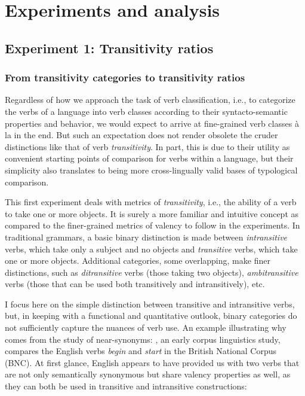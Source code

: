 \chapter{Experiments and analysis}
\section{Experiment 1: Transitivity ratios}\label{sec:exp1}
\subsection{From transitivity categories to transitivity ratios}
Regardless of how we approach the task of verb classification, i.e., to categorize the verbs of a language into verb classes according to their syntacto-semantic properties and behavior, we would expect to arrive at fine-grained verb classes à la \citet{levin1993} in the end. But such an expectation does not render obsolete the cruder distinctions like that of verb \textit{transitivity}. In part, this is due to their utility as convenient starting points of comparison for verbs within a language, but their simplicity also translates to being more cross-lingually valid bases of typological comparison. 

This first experiment deals with metrics of \textit{transitivity}, i.e., the ability of a verb to take one or more objects. It is surely a more familiar and intuitive concept as compared to the finer-grained metrics of valency to follow in the experiments. In traditional grammars, a basic binary distinction is made between \textit{intransitive} verbs, which take only a subject and no objects and \textit{transitive} verbs, which take one or more objects. Additional categories, some overlapping, make finer distinctions, such as \textit{ditransitive} verbs (those taking two objects), \textit{ambitransitive} verbs (those that can be used both transitively and intransitively), etc.

I focus here on the simple distinction between transitive and intransitive verbs, but, in keeping with a functional and quantitative outlook, binary categories do not sufficiently capture the nuances of verb use. An example illustrating why comes from the study of near-synonyms: \citep{biber1998}, an early corpus linguistics study, compares the English verbs \textit{begin} and \textit{start} in the British National Corpus (BNC). At first glance, English appears to have provided us with two verbs that are not only semantically synonymous but share valency properties as well, as they can both be used in transitive and intransitive constructions:


